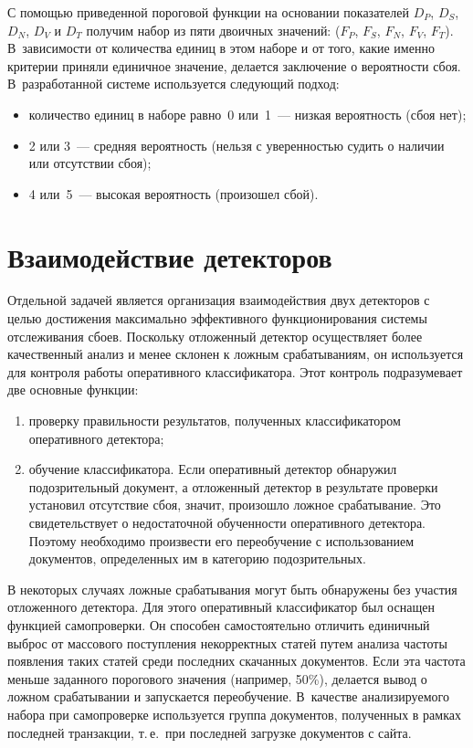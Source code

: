 \begin{multicols}{2}
    С помощью приведенной пороговой функции на основании показателей 
$D_P$, $D_S$, $D_N$, $D_V$ и $D_T$ получим набор из пяти двоичных 
значений: ($F_P$, $F_S$, $F_N$, $F_V$, $F_T$). В~зависимости от количества 
единиц в этом наборе и от того, какие именно критерии приняли единичное 
значение, делается заключение о вероятности сбоя. В~разработанной системе 
используется следующий подход:
  \begin{itemize}
\item количество единиц в наборе равно~0 или~1~--- низкая вероятность (сбоя 
нет);
\item 2 или 3~--- средняя вероятность (нельзя с уверенностью судить о наличии 
или отсутствии сбоя);
\item 4 или~5~--- высокая вероятность (произошел сбой).
\end{itemize}

\section{Взаимодействие детекторов}
  
    Отдельной задачей является организация взаимодействия двух детекторов с 
целью достижения максимально эффективного функционирования системы 
отслеживания сбоев. Поскольку отложен\-ный детектор осуществляет более 
качественный анализ и менее склонен к ложным срабатываниям, он 
используется для контроля работы оперативного классификатора. Этот 
контроль подразумевает две основные функции:
  \begin{enumerate}[(1)]
\item проверку правильности результатов, полученных классификатором 
оперативного детектора; 
\item обучение классификатора. Если оперативный детектор обнаружил 
подозрительный документ, а отложенный детектор в результате проверки 
установил отсутствие сбоя, значит, произошло ложное срабатывание. Это 
свидетельствует о недостаточной обученности оперативного детектора. 
Поэтому необходимо произвести его переобучение с использованием 
документов, определенных им в категорию подозрительных.
\end{enumerate}

    В некоторых случаях ложные срабатывания могут быть обнаружены без 
участия отложенного детектора. Для этого оперативный классификатор был 
оснащен функцией самопроверки. Он способен самостоятельно отличить 
единичный выброс от массового поступления некорректных статей путем 
анализа частоты появления таких статей среди последних скачанных 
документов. Если эта частота меньше заданного порогового значения 
(например, 50\%), делается вывод о ложном срабатывании и запускается 
переобучение. В~качестве анализируемого набора при самопроверке 
используется группа документов, полученных в рамках последней транзакции, 
т.\,е.\ при последней загрузке документов с сайта.
  

\end{multicols}
